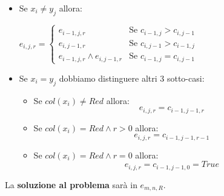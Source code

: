 \documentclass[12pt]{article}
\begin{document}
\begin{itemize}
    \item Se $x_i \neq y_j$ allora:
    \begin{center}
        $e_{i,j,r} = \begin{cases}
            e_{i-1, j, r} & \textrm{Se } c_{i-1, j} > c_{i, j-1} \\
            e_{i, j-1, r} & \textrm{Se } c_{i, j-1} > c_{i-1, j} \\
            e_{i-1,j,r} \land e_{i, j-1, r} & \textrm{Se } c_{i-1,j} = c_{i, j-1}
        \end{cases}$
    \end{center}
    \item Se $x_i = y_j$ dobbiamo distinguere altri 3 sotto-casi:
    \begin{itemize}
        \item Se $col(x_i) \neq Red$ allora:
        $$e_{i,j,r} = c_{i-1, j-1, r}$$
        \item Se $col(x_i) = Red \land r > 0$ allora:
        $$e_{i,j,r} = c_{i-1, j-1, r-1}$$
        \item Se $col(x_i) = Red \land r = 0$ allora:
        $$e_{i,j,r} = c_{i-1, j-1, 0} = True$$  
    \end{itemize}
\end{itemize}
La \textbf{soluzione al problema} sarà in $e_{m,n,R}$.
\end{document}
